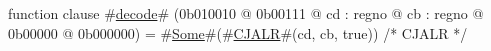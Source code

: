 function clause #\hyperref[zdecode]{decode}# (0b010010 @ 0b00111 @ cd : regno @ cb : regno @ 0b00000 @ 0b000000) = #\hyperref[zSome]{Some}#(#\hyperref[zCJALR]{CJALR}#(cd, cb, true)) /* CJALR */
